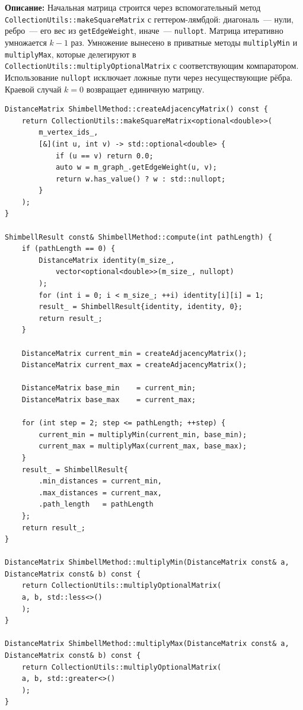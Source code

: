 \textbf{Описание:} Начальная матрица строится через вспомогательный метод\\
\texttt{CollectionUtils::makeSquareMatrix} с геттером-лямбдой:
диагональ~--- нули, ребро~--- его вес из \texttt{getEdgeWeight},
иначе~--- \texttt{nullopt}. Матрица итеративно умножается $k-1$ раз.
Умножение вынесено в приватные методы \texttt{multiplyMin} и
\texttt{multiplyMax}, которые делегируют в
\texttt{CollectionUtils::multiplyOptionalMatrix} с соответствующим
компаратором. Использование \texttt{nullopt} 
исключает ложные пути через несуществующие рёбра. Краевой случай $k=0$ возвращает единичную матрицу. 

\begin{lstlisting}[style=cppstyle, caption={Матрица смежности и метод Шимбелла (ShimbellMethod.cc)}]
DistanceMatrix ShimbellMethod::createAdjacencyMatrix() const {
    return CollectionUtils::makeSquareMatrix<optional<double>>(
        m_vertex_ids_,
        [&](int u, int v) -> std::optional<double> {
            if (u == v) return 0.0;
            auto w = m_graph_.getEdgeWeight(u, v);
            return w.has_value() ? w : std::nullopt;
        }
    );
}

ShimbellResult const& ShimbellMethod::compute(int pathLength) {
    if (pathLength == 0) {
        DistanceMatrix identity(m_size_,
            vector<optional<double>>(m_size_, nullopt)
        );
        for (int i = 0; i < m_size_; ++i) identity[i][i] = 1;
        result_ = ShimbellResult{identity, identity, 0};
        return result_;
    }

    DistanceMatrix current_min = createAdjacencyMatrix();
    DistanceMatrix current_max = createAdjacencyMatrix();
    
    DistanceMatrix base_min    = current_min;
    DistanceMatrix base_max    = current_max;

    for (int step = 2; step <= pathLength; ++step) {
        current_min = multiplyMin(current_min, base_min);
        current_max = multiplyMax(current_max, base_max);
    }
    result_ = ShimbellResult{
        .min_distances = current_min,
        .max_distances = current_max,
        .path_length   = pathLength
    };
    return result_;
}

DistanceMatrix ShimbellMethod::multiplyMin(DistanceMatrix const& a, DistanceMatrix const& b) const {
    return CollectionUtils::multiplyOptionalMatrix(
    a, b, std::less<>()
    );
}

DistanceMatrix ShimbellMethod::multiplyMax(DistanceMatrix const& a, DistanceMatrix const& b) const {
    return CollectionUtils::multiplyOptionalMatrix(
    a, b, std::greater<>()
    );
}
\end{lstlisting}

